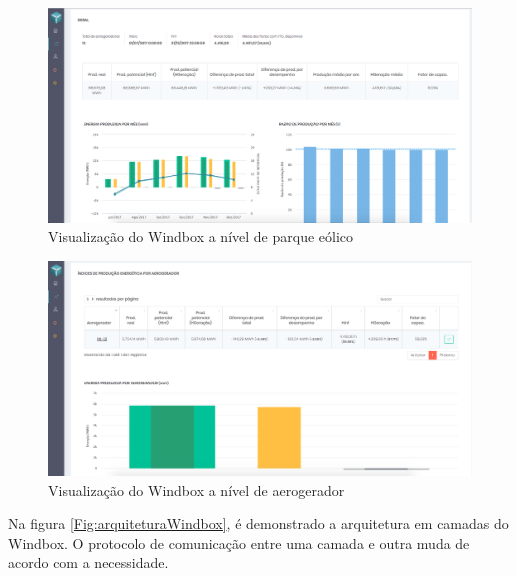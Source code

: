 \begin{figure}[htbp!] \begin{center}
\includegraphics[width=1\linewidth]{./figuras/tela-parque}
\caption{Visualização do Windbox a nível de parque eólico}
\label{Fig:visualizaçãoNivelParqueEolico}
\end{center} 
\end{figure}

\begin{figure}[htbp!] \begin{center}
\includegraphics[width=1\linewidth]{./figuras/tela-aerogerador}
\caption{Visualização do Windbox a nível de aerogerador}
\label{Fig:visualizaçãoNivelAerogerador}
\end{center} 
\end{figure}

Na figura \ref{Fig:arquiteturaWindbox}, é demonstrado a arquitetura em camadas do Windbox. O protocolo de comunicação entre uma camada e outra muda de acordo com a necessidade. 

